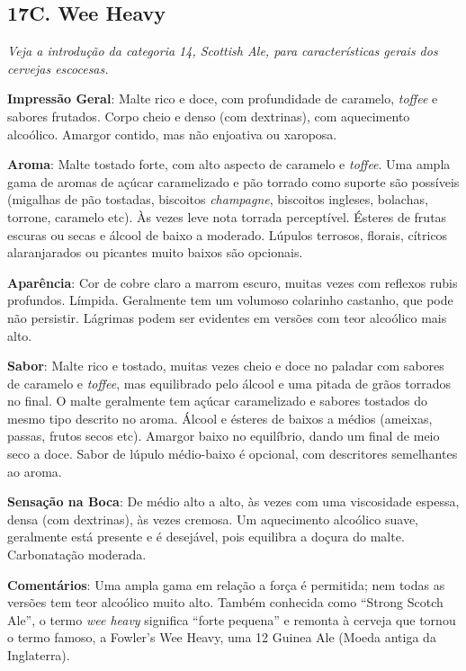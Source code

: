 \subsection*{17C. Wee Heavy}
\textit{Veja a introdução da categoria 14, Scottish Ale, para características gerais dos cervejas escocesas.}

\textbf{Impressão Geral}: Malte rico e doce, com profundidade de caramelo, \textit{toffee} e sabores frutados. Corpo cheio e denso (com dextrinas), com aquecimento alcoólico. Amargor contido, mas não enjoativa ou xaroposa.

\textbf{Aroma}: Malte tostado forte, com alto aspecto de caramelo e \textit{toffee}. Uma ampla gama de aromas de açúcar caramelizado e pão torrado como suporte são possíveis (migalhas de pão tostadas, biscoitos \textit{champagne}, biscoitos ingleses, bolachas, torrone, caramelo etc). Às vezes leve nota torrada perceptível. Ésteres de frutas escuras ou secas e álcool de baixo a moderado. Lúpulos terrosos, florais, cítricos alaranjarados ou picantes muito baixos são opcionais.

\textbf{Aparência}: Cor de cobre claro a marrom escuro, muitas vezes com reflexos rubis profundos. Límpida. Geralmente tem um volumoso colarinho castanho, que pode não persistir. Lágrimas podem ser evidentes em versões com teor alcoólico mais alto.

\textbf{Sabor}: Malte rico e tostado, muitas vezes cheio e doce no paladar com sabores de caramelo e \textit{toffee}, mas equilibrado pelo álcool e uma pitada de grãos torrados no final. O malte geralmente tem açúcar caramelizado e sabores tostados do mesmo tipo descrito no aroma. Álcool e ésteres de baixos a médios (ameixas, passas, frutos secos etc). Amargor baixo no equilíbrio, dando um final de meio seco a doce. Sabor de lúpulo médio-baixo é opcional, com descritores semelhantes ao aroma.

\textbf{Sensação na Boca}: De médio alto a alto, às vezes com uma viscosidade espessa, densa (com dextrinas), às vezes cremosa. Um aquecimento alcoólico suave, geralmente está presente e é desejável, pois equilibra a doçura do malte. Carbonatação moderada.

\textbf{Comentários}: Uma ampla gama em relação a força é permitida; nem todas as versões tem teor alcoólico muito alto. Também conhecida como “Strong Scotch Ale”, o termo \textit{wee heavy} significa “forte pequena” e remonta à cerveja que tornou o termo famoso, a Fowler’s Wee Heavy, uma 12 Guinea Ale (Moeda antiga da Inglaterra).

